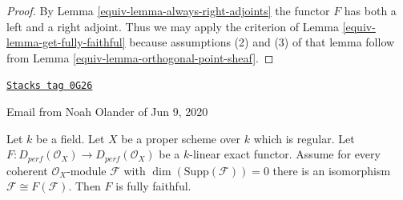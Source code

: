\begin{proof}

By Lemma \ref{equiv-lemma-always-right-adjoints} the functor $F$
has both a left and a right adjoint. Thus we may apply the criterion
of Lemma \ref{equiv-lemma-get-fully-faithful}
because assumptions (2) and (3) of that lemma
follow from Lemma \ref{equiv-lemma-orthogonal-point-sheaf}.
\end{proof}

\begin{lemma}
\label{equiv-lemma-noah-pre}
\href{https://stacks.math.columbia.edu/tag/0G26}{\texttt{Stacks tag 0G26}}

\begin{reference}
Email from Noah Olander of Jun 9, 2020
\end{reference}
Let $k$ be a field. Let $X$ be a proper scheme over $k$ which is regular.
Let $F : D_{perf}(\mathcal{O}_X) \to D_{perf}(\mathcal{O}_X)$
be a $k$-linear exact functor. Assume for every coherent
$\mathcal{O}_X$-module $\mathcal{F}$ with $\dim(\text{Supp}(\mathcal{F})) = 0$
there is an isomorphism $\mathcal{F} \cong F(\mathcal{F})$.
Then $F$ is fully faithful.
\end{lemma}


